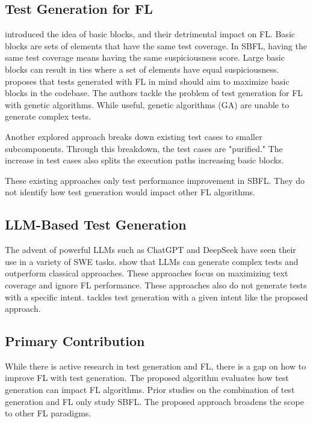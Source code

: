 \documentclass[conference]{IEEEtran}
\begin{document}
\subsection{Test Generation for FL}

\cite{baudry2006improving} introduced the idea of basic blocks, and their detrimental impact on FL. Basic blocks are sets of elements that have the same test coverage. In SBFL, having the same test coverage means having the same suspiciousness score. Large basic blocks can result in ties where a set of elements have equal suspiciousness. \cite{baudry2006improving} proposes that tests generated with FL in mind should aim to maximize basic blocks in the codebase. The authors tackle the problem of test generation for FL with genetic algorithms. While useful, genetic algorithms (GA) are unable to generate complex tests.

Another explored approach \cite{xuan2014test} breaks down existing test cases to smaller subcomponents. Through this breakdown, the test cases are "purified." The increase in test cases also splits the execution paths increasing basic blocks.

These existing approaches only test performance improvement in SBFL. They do not identify how test generation would impact other FL algorithms.

\subsection{LLM-Based Test Generation}

The advent of powerful LLMs such as ChatGPT and DeepSeek have seen their use in a variety of SWE tasks. \cite{chen2024chatunitest, wang2024hits, zhang2410llm} show that LLMs can generate complex tests and outperform classical approaches. These approaches focus on maximizing text coverage and ignore FL performance. These approaches also do not generate tests with a specific intent. \cite{nan2025test} tackles test generation with a given intent like the proposed approach.

\subsection{Primary Contribution}

While there is active research in test generation and FL, there is a gap on how to improve FL with test generation. The proposed algorithm evaluates how test generation can impact FL algorithms. Prior studies on the combination of test generation and FL only study SBFL. The proposed approach broadens the scope to other FL paradigms.
\end{document}
